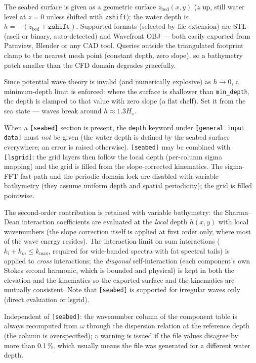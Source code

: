 The seabed surface is given as a geometric surface $z_{\mathrm{bed}}(x,y)$ ($z$ up, still water level at $z=0$ unless shifted with \texttt{zshift}); the water depth is $h = -(z_{\mathrm{bed}} + \texttt{zshift})$. Supported formats (selected by file extension) are STL (ascii or binary, auto-detected) and Wavefront OBJ --- both easily exported from Paraview, Blender or any CAD tool. Queries outside the triangulated footprint clamp to the nearest mesh point (constant depth, zero slope), so a bathymetry patch smaller than the CFD domain degrades gracefully.

Since potential wave theory is invalid (and numerically explosive) as $h\rightarrow 0$, a minimum-depth limit is enforced: where the surface is shallower than \texttt{min\_depth}, the depth is clamped to that value with zero slope (a flat shelf). Set it from the sea state --- waves break around $h \approx 1.3 H_s$.

When a \texttt{[seabed]} section is present, the \texttt{depth} keyword under \texttt{[general input data]} must \emph{not} be given (the water depth is defined by the seabed surface everywhere; an error is raised otherwise). \texttt{[seabed]} may be combined with \texttt{[lsgrid]}: the grid layers then follow the local depth (per-column sigma mapping) and the grid is filled from the slope-corrected kinematics. The sigma-FFT fast path and the periodic domain lock are disabled with variable bathymetry (they assume uniform depth and spatial periodicity); the grid is filled pointwise.

The second-order contribution is retained with variable bathymetry: the Sharma--Dean interaction coefficients are evaluated at the \emph{local} depth $h(x,y)$ with local wavenumbers (the slope correction itself is applied at first order only, where most of the wave energy resides). The interaction limit on sum interactions ($k_i + k_m \le k_{\max}$, required for wide-banded spectra with fat spectral tails) is applied to \emph{cross} interactions; the \emph{diagonal} self-interaction (each component's own Stokes second harmonic, which is bounded and physical) is kept in both the elevation and the kinematics so the exported surface and the kinematics are mutually consistent. Note that \texttt{[seabed]} is supported for irregular waves only (direct evaluation or lsgrid).

Independent of \texttt{[seabed]}: the wavenumber column of the component table is always recomputed from $\omega$ through the dispersion relation at the reference depth (the column is overspecified); a warning is issued if the file values disagree by more than 0.1\,\%, which usually means the file was generated for a different water depth.

